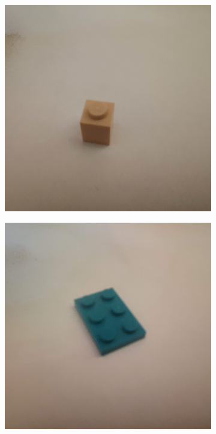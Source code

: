 \documentclass[]{article}
\begin{document}
\begin{figure}[h]
\begin{subfigure}[b]{0.2\textwidth}
    \end{subfigure}
    \begin{subfigure}[b]{0.2\textwidth}
        \includegraphics[width=\textwidth]{photographed images/5.jpg}
    \end{subfigure}
    \begin{subfigure}[b]{0.2\textwidth}
        \includegraphics[width=\textwidth]{photographed images/6.jpg}

\end{subfigure}
\end{figure}
\end{document}
